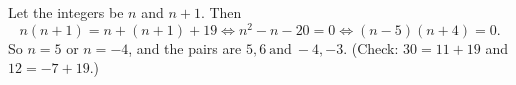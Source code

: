 Let the integers be $n$ and $n+1$. Then
\[
n(n+1)=n+(n+1)+19\iff n^2-n-20=0\iff (n-5)(n+4)=0 .
\]
So $n=5$ or $n=-4$, and the pairs are $\boxed{5,6\ \text{and}\ -4,-3}$. (Check: $30=11+19$ and $12=-7+19$.)
